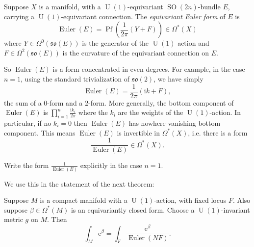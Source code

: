 \documentclass[12pt,letterpaper,reqno]{article}
\numberwithin{equation}{section}
\newcommand{\fso}{{\mathfrak {so}}}
\newcommand{\I}{{\mathrm i}}
\newcommand{\e}{{\mathrm e}}
\newcommand{\ti}[1]{\textit{#1}}
\DeclareMathOperator{\SO}{SO}
\DeclareMathOperator{\U}{U}
\DeclareMathOperator{\Pf}{Pf}
\DeclareMathOperator{\Euler}{Euler}
\newcommand{\fixme}[1]{{\color{orange}{[#1]}}}
\begin{document}
\begin{defn} Suppose $X$ is a manifold, with
a $\U(1)$-equivariant $\SO(2n)$-bundle $E$, carrying a 
$\U(1)$-equivariant connection. 
The \ti{equivariant Euler form} of $E$ is \fixme{check signs}
\begin{equation}
  \Euler(E) = \Pf\left(\frac{1}{2\pi} \left(Y + F\right) \right) \in \Omega^*(X)
\end{equation}
where $Y \in \Omega^0(\fso(E))$ is the generator of the $\U(1)$ action
and $F \in \Omega^2(\fso(E))$ is the curvature of the 
equivariant connection on $E$.
\end{defn}
So $\Euler(E)$ is a form concentrated in even degrees.
For example, in the case $n=1$, using the standard trivialization
of $\fso(2)$, we have simply
\begin{equation}
  \Euler(E) = \frac{1}{2\pi} (\I k + F),
\end{equation}
the sum of a $0$-form and a $2$-form.
More generally, the bottom component of $\Euler(E)$ is
$\prod_{i=1}^n \frac{\I k_i}{2\pi}$ where the $k_i$ are the weights of the 
$\U(1)$-action. In particular, if no $k_i = 0$ then $\Euler(E)$
has nowhere-vanishing bottom component. This means $\Euler(E)$
is invertible in $\Omega^*(X)$, i.e.
there is a form
\begin{equation}
  \frac{1}{\Euler(E)} \in \Omega^*(X).
\end{equation}

\begin{exercise}
Write the form $\frac{1}{\Euler(E)}$ explicitly in the case $n=1$.
\end{exercise}

We use this in the statement of the next theorem:

\begin{thm} \label{thm:abbv}
Suppose $M$ is a compact manifold with a $\U(1)$-action, with fixed locus
$F$.
Also suppose $\beta \in \Omega^*(M)$ is an equivariantly closed form.
Choose a $\U(1)$-invariant metric $g$ on $M$. Then
\begin{equation}
\int_M \e^{\beta} = \int_F \frac{\e^{\beta}}{\Euler(NF)}.
\end{equation}
\end{thm}
\end{document}
